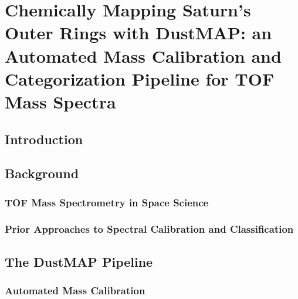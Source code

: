 %

\chapter{Chemically Mapping Saturn's Outer Rings with DustMAP: an Automated Mass Calibration and Categorization Pipeline for TOF Mass Spectra}
\label{ch:dustmap}

\begin{quote}
  \itshape
\end{quote}

\section{Introduction}
\label{sec:ch4-intro}

\section{Background}
\label{sec:ch4-background}

\subsection{TOF Mass Spectrometry in Space Science}
\todo{}

\subsection{Prior Approaches to Spectral Calibration and Classification}
\todo{}

\section{The DustMAP Pipeline}
\label{sec:ch4-pipeline}

\subsection{Automated Mass Calibration}

